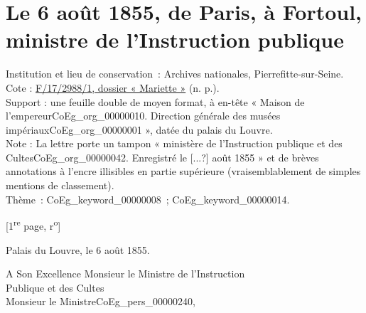 \documentclass{book}
\begin{document}
\section*{Le 6 août 1855, de Paris, à Fortoul, ministre de l’Instruction publique}
 \label{labCoEg_Mariette_1855-08-06}
{\footnotesize
\noindent Institution et lieu de conservation~: Archives nationales, Pierrefitte-sur-Seine.\\
Cote : \hyperlink{CoEg_Mariette_ms_002}{F/17/2988/1, dossier « Mariette »} (n. p.).\\
Support : une feuille double de moyen format, à en-tête « Maison de l’empereur\gls{CoEg_org_00000010}. Direction générale des musées impériaux\gls{CoEg_org_00000001} », datée du palais du Louvre.\\
Note : La lettre porte un tampon « ministère de l’Instruction publique et des Cultes\gls{CoEg_org_00000042}. Enregistré le [...?] août 1855 » et de brèves annotations à l’encre illisibles en partie supérieure (vraisemblablement de simples mentions de classement).\\
Thème~: \gls{CoEg_keyword_00000008}~; \gls{CoEg_keyword_00000014}.}

{\footnotesize\begin{center} {[1\textsuperscript{re} page, r\textsuperscript{o}]}\end{center}}
\begin{flushright}Palais du Louvre, le 6 août 1855.\end{flushright}
\indent A Son Excellence Monsieur le Ministre de l’Instruction\\
\indent\hspace{3cm} Publique et des Cultes\\

\hspace{1cm} Monsieur le Ministre\gls{CoEg_pers_00000240},\\
\end{document}

